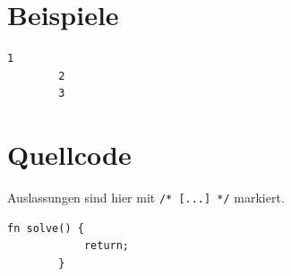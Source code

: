 \documentclass[a4paper,10pt,ngerman]{scrartcl}
\begin{document}
    \section{Beispiele}

    \begin{lstlisting}[style=plain]
        1
        2
        3
    \end{lstlisting}


    \section{Quellcode}
    Auslassungen sind hier mit \texttt{/* [...] */} markiert.

    \begin{lstlisting}[style=colouredRust, label={lst:maincode}]
        fn solve() {
            return;
        }
    \end{lstlisting}
\end{document}
